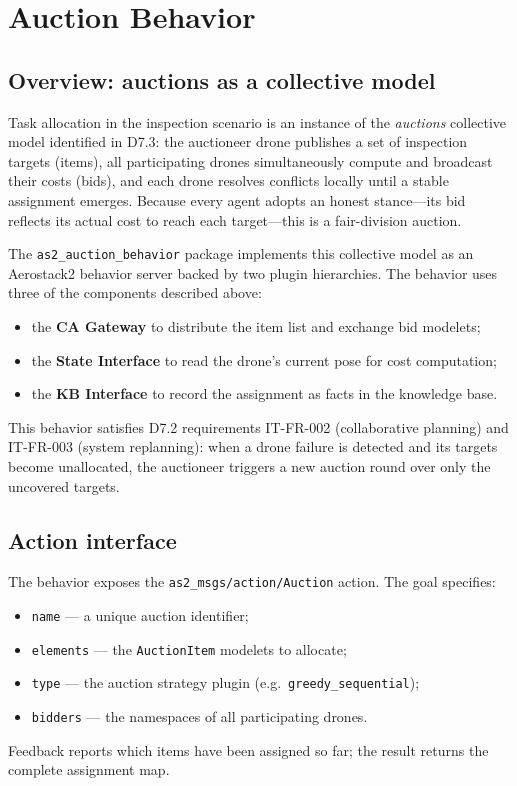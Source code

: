 \documentclass[deliverable]{csreport}
\renewcommand{\code}[1]{\texttt{\textcolor{CSMaroon}{#1}}}%
\begin{document}
\chapter{Auction Behavior}
\label{ch:auction}

\section{Overview: auctions as a collective model}

Task allocation in the inspection scenario is an instance of the \emph{auctions} collective model identified in D7.3: the auctioneer drone publishes a set of inspection targets (items), all participating drones simultaneously compute and broadcast their costs (bids), and each drone resolves conflicts locally until a stable assignment emerges. Because every agent adopts an honest stance---its bid reflects its actual cost to reach each target---this is a fair-division auction.

The \code{as2\_auction\_behavior} package implements this collective model as an Aerostack2 behavior server backed by two plugin hierarchies. The behavior uses three of the components described above:
\begin{itemize}
  \item the \textbf{CA Gateway} to distribute the item list and exchange bid modelets;
  \item the \textbf{State Interface} to read the drone's current pose for cost computation;
  \item the \textbf{KB Interface} to record the assignment as facts in the knowledge base.
\end{itemize}

This behavior satisfies D7.2 requirements IT-FR-002 (collaborative planning) and IT-FR-003 (system replanning): when a drone failure is detected and its targets become unallocated, the auctioneer triggers a new auction round over only the uncovered targets.

\section{Action interface}

The behavior exposes the \code{as2\_msgs/action/Auction} action. The goal specifies:
\begin{itemize}
  \item \code{name} --- a unique auction identifier;
  \item \code{elements} --- the \code{AuctionItem} modelets to allocate;
  \item \code{type} --- the auction strategy plugin (e.g.\ \code{greedy\_sequential});
  \item \code{bidders} --- the namespaces of all participating drones.
\end{itemize}
Feedback reports which items have been assigned so far; the result returns the complete assignment map.
\end{document}
